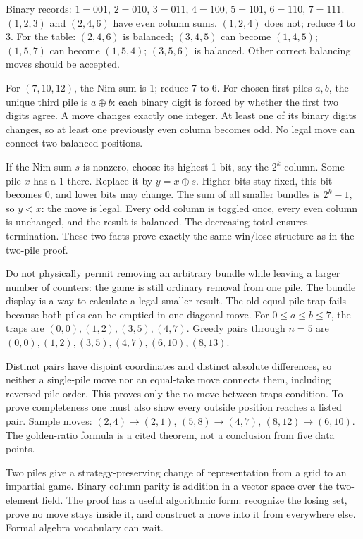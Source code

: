 \documentclass[11pt]{article}
\begin{document}
Binary records: $1=001$, $2=010$, $3=011$, $4=100$, $5=101$, $6=110$, $7=111$. $(1,2,3)$ and $(2,4,6)$ have even column sums. $(1,2,4)$ does not; reduce 4 to 3. For the table: $(2,4,6)$ is balanced; $(3,4,5)$ can become $(1,4,5)$; $(1,5,7)$ can become $(1,5,4)$; $(3,5,6)$ is balanced. Other correct balancing moves should be accepted.

For $(7,10,12)$, the Nim sum is 1; reduce 7 to 6. For chosen first piles $a,b$, the unique third pile is $a\mathbin{\oplus}b$: each binary digit is forced by whether the first two digits agree.
A move changes exactly one integer. At least one of its binary digits changes, so at least one previously even column becomes odd. No legal move can connect two balanced positions.

If the Nim sum $s$ is nonzero, choose its highest 1-bit, say the $2^k$ column. Some pile $x$ has a 1 there. Replace it by $y=x\mathbin{\oplus}s$. Higher bits stay fixed, this bit becomes 0, and lower bits may change. The sum of all smaller bundles is $2^k-1$, so $y<x$: the move is legal. Every odd column is toggled once, every even column is unchanged, and the result is balanced. The decreasing total ensures termination. These two facts prove exactly the same win/lose structure as in the two-pile proof.

Do not physically permit removing an arbitrary bundle while leaving a larger number of counters: the game is still ordinary removal from one pile. The bundle display is a way to calculate a legal smaller result.
The old equal-pile trap fails because both piles can be emptied in one diagonal move. For $0\le a\le b\le7$, the traps are $(0,0),(1,2),(3,5),(4,7)$. Greedy pairs through $n=5$ are $(0,0),(1,2),(3,5),(4,7),(6,10),(8,13)$.

Distinct pairs have disjoint coordinates and distinct absolute differences, so neither a single-pile move nor an equal-take move connects them, including reversed pile order. This proves only the no-move-between-traps condition. To prove completeness one must also show every outside position reaches a listed pair. Sample moves: $(2,4)\to(2,1)$, $(5,8)\to(4,7)$, $(8,12)\to(6,10)$. The golden-ratio formula is a cited theorem, not a conclusion from five data points.

\newpage

Two piles give a strategy-preserving change of representation from a grid to an impartial game. Binary column parity is addition in a vector space over the two-element field. The proof has a useful algorithmic form: recognize the losing set, prove no move stays inside it, and construct a move into it from everywhere else. Formal algebra vocabulary can wait.
\end{document}
